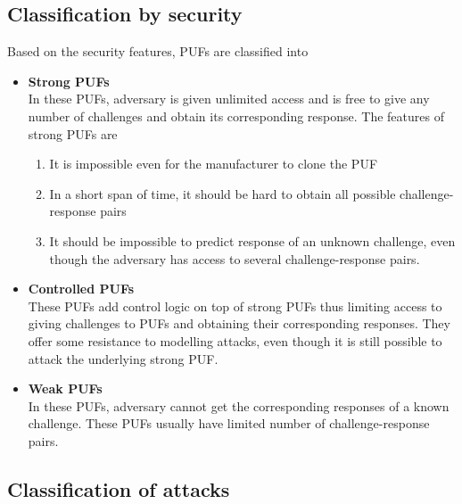 \subsection {Classification by security}
Based on the security features, PUFs are classified into
\begin{itemize}
\item \textbf{Strong PUFs}\\
In these PUFs, adversary is given unlimited access and is free to give any number of challenges and obtain its corresponding response. The features of strong PUFs are
\begin{enumerate}
\item It is impossible even for the manufacturer to clone the PUF
\item In a short span of time, it should be hard to obtain all possible challenge-response pairs
\item It should be impossible to predict response of an unknown challenge, even though the adversary has access to several challenge-response pairs. 
\end{enumerate}


\item \textbf{Controlled PUFs}\\
These PUFs add control logic on top of strong PUFs thus limiting access to giving challenges to PUFs and obtaining their corresponding responses. They offer some resistance to modelling attacks, even though it is still possible to attack the underlying strong PUF.


\item \textbf{Weak PUFs}\\
In these PUFs, adversary cannot get the corresponding responses of a known challenge. These PUFs usually have limited number of challenge-response pairs. 
\end{itemize}
\subsection {Classification of attacks}

